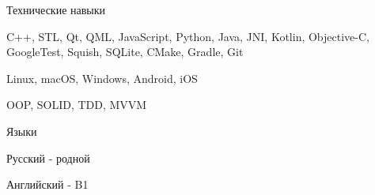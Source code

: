 

\begin{cventries}

\cventry
    {Технические навыки}
    {}
    {}
    {}
    {
    \begin{cvitems}
        \item {C++, STL, Qt, QML, JavaScript, Python, Java, JNI, Kotlin, Objective-C, GoogleTest, Squish, SQLite, CMake, Gradle, Git}
        \item {Linux, macOS, Windows, Android, iOS}
        \item {OOP, SOLID, TDD, MVVM}
    \end{cvitems}
    }

\cventry
    {Языки}
    {}
    {}
    {}
    {
    \begin{cvitems}
        \item {Русский - родной}
        \item {Английский - B1}
    \end{cvitems}
    }

\end{cventries}
